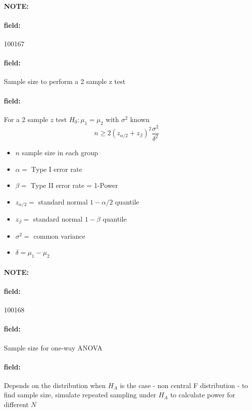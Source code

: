 \documentclass[12pt]{article}
\newenvironment{note}{\paragraph{NOTE:}}{}
\newenvironment{field}{\paragraph{field:}}{}
\begin{document}
\begin{note}
    \begin{field}
        \tiny 100167
    \end{field}
    \begin{field}
        Sample size to perform a 2 sample z test
    \end{field}
    \begin{field}
      For a 2 sample $z$ test $H_0: \mu_1 = \mu_2$ with $\sigma^2$ known
        $$ n \geq 2(z_{\alpha/2} + z_{\beta})^2 \frac{\sigma^2}{\delta^2}$$
        \begin{itemize}
          \item $n$ sample size in each group
          \item $\alpha = $ Type I error rate
          \item $\beta = $ Type II error rate = 1-Power
          \item $z_{\alpha/2}= $ standard normal $1 - \alpha/2$ quantile
          \item $z_{\beta} = $ standard normal $1 - \beta$ quantile
          \item $\sigma^2 = $ common variance
          \item $\delta = \mu_1 - \mu_2 $
        \end{itemize}
    \end{field}
\end{note}


\begin{note}
    \begin{field}
        \tiny 100168
    \end{field}
    \begin{field}
        Sample size for one-way ANOVA
    \end{field}
    \begin{field}
        Depends on the distribution when $H_A$ is the case - non central F distribution - to find sample size, simulate repeated sampling under $H_A$ to calculate power for different $N$
    \end{field}
\end{note}
\end{document}
